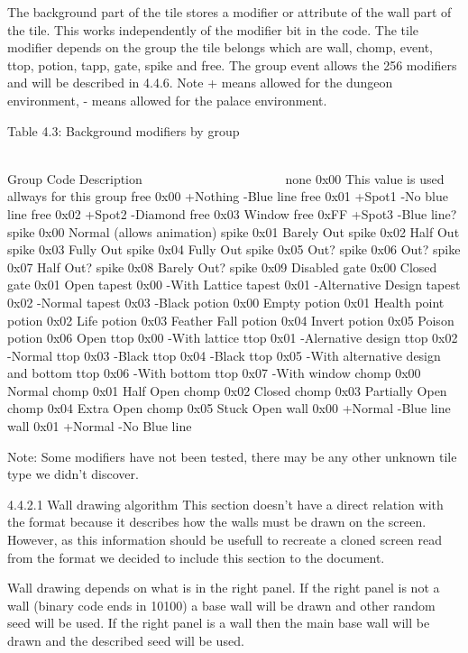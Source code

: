  The background part of the tile stores a modifier or attribute of the
 wall part of the tile. This works independently of the modifier bit in the
 code. The tile  modifier depends on the group the tile belongs which are
 wall, chomp, event, ttop, potion, tapp, gate, spike and free.
 The group event allows the 256 modifiers and will be described in 4.4.6.
 Note + means allowed for the dungeon environment, - means allowed for the
 palace environment.

                   Table 4.3: Background modifiers by group
                   ~~~~~~~~~~~~~~~~~~~~~~~~~~~~~~~~~~~~~~~~

  Group  Code Description
  ~~~~~  ~~~~ ~~~~~~~~~~~
  none   0x00 This value is used allways for this group
  free   0x00 +Nothing -Blue line
  free   0x01 +Spot1   -No blue line
  free   0x02 +Spot2   -Diamond
  free   0x03 Window
  free   0xFF +Spot3   -Blue line?
  spike  0x00 Normal (allows animation)
  spike  0x01 Barely Out
  spike  0x02 Half Out
  spike  0x03 Fully Out
  spike  0x04 Fully Out
  spike  0x05 Out?
  spike  0x06 Out?
  spike  0x07 Half Out?
  spike  0x08 Barely Out?
  spike  0x09 Disabled
  gate   0x00 Closed
  gate   0x01 Open
  tapest 0x00 -With Lattice
  tapest 0x01 -Alternative Design
  tapest 0x02 -Normal
  tapest 0x03 -Black
  potion 0x00 Empty
  potion 0x01 Health point
  potion 0x02 Life
  potion 0x03 Feather Fall
  potion 0x04 Invert
  potion 0x05 Poison
  potion 0x06 Open
  ttop   0x00 -With lattice
  ttop   0x01 -Alernative design
  ttop   0x02 -Normal
  ttop   0x03 -Black
  ttop   0x04 -Black
  ttop   0x05 -With alternative design and bottom
  ttop   0x06 -With bottom
  ttop   0x07 -With window
  chomp  0x00 Normal
  chomp  0x01 Half Open
  chomp  0x02 Closed
  chomp  0x03 Partially Open
  chomp  0x04 Extra Open
  chomp  0x05 Stuck Open
  wall   0x00 +Normal  -Blue line
  wall   0x01 +Normal  -No Blue line

 Note: Some modifiers have not been tested, there may be any other unknown
       tile type we didn't discover.


4.4.2.1 Wall drawing algorithm
 This section doesn't have a direct relation with the format because it
 describes how the walls must be drawn on the screen. However, as this
 information should be usefull to recreate a cloned screen read from the
 format we decided to include this section to the document.

 Wall drawing depends on what is in the right panel. If the right panel
 is not a wall (binary code ends in 10100) a base wall will be drawn and
 other random seed will be used. If the right panel is a wall then the main
 base wall will be drawn and the described seed will be used.

